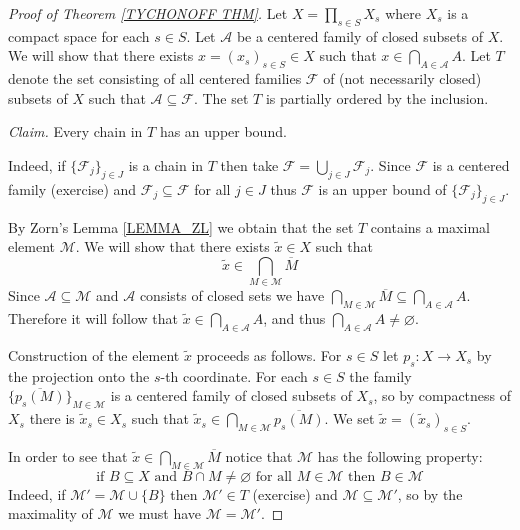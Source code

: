 \documentclass[11pt, letterpaper, oneside]{report}
\theoremstyle{pplain}
\newtheorem{ITERMVALUE THM}[theorem]{Intermediate Value Theorem}
\newtheorem{HEINEBOREL THM}[theorem]{Heine-Borel Theorem}
\newtheorem{UMETR THM}[theorem]{Urysohn Metrization Theorem}
\newtheorem{UMETR2 THM}[theorem]{Urysohn Metrization Theorem (v.2)}
\theoremstyle{ddefinition}
\theoremstyle{nnn}
\newtheorem{TDA NN}[theorem]{Topological Data Analysis. }
\theoremstyle{eexercise}
\renewcommand{\AA}{{\mathcal A}}
\newcommand{\FF}{{\mathcal F}}
\newcommand{\MM}{{\mathcal M}}
\begin{document}
\begin{proof}[Proof of Theorem \ref{TYCHONOFF THM}]
Let $X = \prod_{s\in S} X_{s}$ where $X_{s}$ is a compact space for each $s\in S$. 
Let $\AA$ be a  centered family of closed subsets of $X$. 
We will show that there exists $x = (x_{s})_{s\in S}\in X$ such that $x\in \bigcap_{A\in \AA} A$.
Let $T$ denote the set consisting of all centered families $\FF$ of (not necessarily closed)
subsets of $X$ such that $\AA\subseteq \FF$. The set $T$ is partially ordered by the inclusion. 

\emph{Claim.} Every chain in $T$ has an upper bound. 

Indeed, if $\{\FF_{j}\}_{j\in J}$ is a chain in $T$ then take $\FF = \bigcup_{j\in J} \FF_{j}$. 
Since $\FF$ is a centered family (exercise) and $\FF_{j}\subseteq \FF$ for all $j\in J$ thus $\FF$ is an 
upper bound of $\{\FF_{j}\}_{j\in J}$.  


By Zorn's Lemma \ref{LEMMA_ZL} we obtain that the set $T$ contains a maximal element $\MM$. 
We will show that there exists $\tilde x\in X$ such that 
$$\tilde x\in \bigcap_{M\in \MM} \overline{M}$$
Since $\AA\subseteq \MM$ and $\AA$ consists of closed sets 
we have $\bigcap_{M\in \MM} \overline{M} \subseteq \bigcap_{A\in\AA} A$. Therefore it will
follow that $\tilde x\in \bigcap_{A\in \AA} A$, and thus $\bigcap_{A\in \AA} A\neq \varnothing$. 

Construction of the element $\tilde x$ proceeds as follows. For $s\in S$ let $p_{s}\colon X\to X_{s}$
by the projection onto the $s$-th coordinate. For each $s\in S$ the family 
$\{\overline{p_{s}(M)}\}_{M\in \MM}$ is a centered family of closed subsets of $X_{s}$, so by 
compactness of $X_{s}$ there is $\tilde x_{s}\in X_{s}$ such that 
$\tilde x_{s}\in \bigcap_{M\in \MM} \overline{p_{s}(M)}$. We set $\tilde x= (\tilde x_{s})_{s\in S}$.  


In order to see that $\tilde x\in \bigcap_{M\in \MM} \overline{M}$ notice that $\MM$ has the following property:
\begin{equation*}
\label{MAX CENT PROP EQ}
\text{if $B\subseteq X$ and $B\cap M\neq \varnothing$ for all $M\in \MM$ then $B\in \MM$}
\tag{$\ast$}
\end{equation*}
Indeed, if  $\MM' = \MM \cup \{B\}$ then $\MM' \in T$ (exercise) and $\MM\subseteq \MM'$, 
so by the maximality of $\MM$ we must have $\MM= \MM'$. 



\end{proof}
\end{document}
